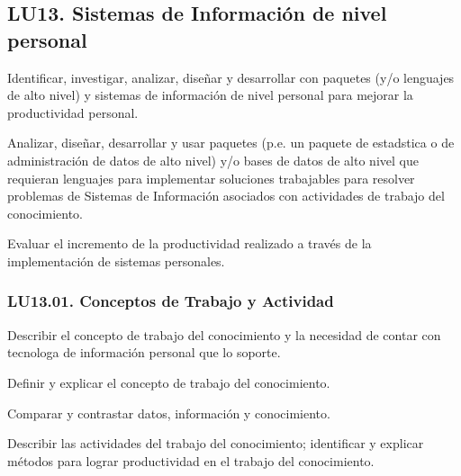 \subsection{LU13. Sistemas de Información de nivel personal}\label{sec:LU13}
\begin{LearningUnit}
\begin{LUGoal}
\item Identificar, investigar, analizar, diseñar y desarrollar con paquetes (y/o lenguajes de alto nivel) y sistemas de información de nivel personal para mejorar la productividad personal.
\end{LUGoal}

\begin{LUObjective}
\item Analizar, diseñar, desarrollar y usar paquetes (p.e. un paquete de estad­stica o de administración de datos de alto nivel) y/o bases de datos de alto nivel que requieran lenguajes para implementar soluciones trabajables para resolver problemas de Sistemas de Información asociados con actividades de trabajo del conocimiento.
\item Evaluar el incremento de la productividad realizado a través de la implementación de sistemas personales.
\end{LUObjective}
\end{LearningUnit}

\subsubsection{LU13.01. Conceptos de Trabajo y Actividad}\label{sec:LU13.01}
\begin{LearningUnit}
\begin{LUGoal}
\item Describir el concepto de trabajo del conocimiento y la necesidad de contar con tecnolog­a de información personal que lo soporte.
\end{LUGoal}

\begin{LUObjective}
\item Definir y explicar el concepto de trabajo del conocimiento.
\item Comparar y contrastar datos, información y conocimiento.
\item Describir las actividades del trabajo del conocimiento; identificar y explicar métodos para lograr productividad en el trabajo del conocimiento.
\end{LUObjective}
\end{LearningUnit}

